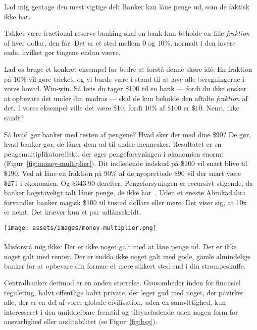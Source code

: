 Lad mig gentage den mest vigtige del: Banker kan låne penge ud, som de faktisk 
ikke har.

Takket være fractional reserve banking skal en bank kun beholde en lille
\textit{fraktion} af hver dollar, den får. Det er et sted mellem $0$ og $10\%$,
normalt i den lavere ende, hvilket gør tingene endnu værre.

Lad os bruge et konkret eksempel for bedre at forstå denne skøre idé: En
fraktion på $10\%$ vil gøre tricket, og vi burde være i stand til at lave alle
beregningerne i vores hoved. Win-win. Så hvis du tager \$100 til en
bank --- fordi du ikke ønsker at opbevare det under din madras --- skal de kun
beholde den aftalte \textit{fraktion} af det. I vores eksempel ville det
være \$10, fordi 10\% af \$100 er \$10. Nemt, ikke sandt?

Så hvad gør banker med resten af pengene? Hvad sker der med dine \$90? De
gør, hvad banker gør, de låner dem ud til andre mennesker. Resultatet er en 
pengemultiplikatoreffekt, der øger pengeforsyningen i økonomien enormt
(Figur~\ref{fig:money-multiplier}). Dit indledende indskud på \$100 vil snart
blive til \$190. Ved at låne en fraktion på 90\% af de nyoprettede \$90 vil der
snart være \$271 i økonomien. Og \$343.90 derefter. Pengeforsyningen er
recursivt stigende, da banker bogstaveligt talt låner penge, de ikke
har~\cite{wiki:money-multiplier}. Uden et eneste Abrakadabra forvandler
banker magisk \$100 til tusind dollars eller mere. Det viser sig, at 10x er 
nemt. Det kræver kun et par udlånsskridt.

\begin{center}
  \centering
  \texttt{[image: assets/images/money-multiplier.png]}
  \label{fig:money-multiplier}
\end{center}
  
\paragraph{}
Misforstå mig ikke: Der er ikke noget galt med at låne penge ud. Der er
ikke noget galt med renter. Der er endda ikke noget galt med gode,
gamle almindelige banker for at opbevare din formue et mere sikkert sted end i
din strømpeskuffe.

Centralbanker derimod er en anden størrelse. Grusomheder inden for finansiel
regulering, halvt offentlige halvt private, der leger gud med noget, der
påvirker alle, der er en del af vores globale civilisation, uden en
samvittighed, kun interesseret i den umiddelbare fremtid og tilsyneladende
uden nogen form for ansvarlighed eller auditabilitet (se Figur~\ref{fig:bsg}).

